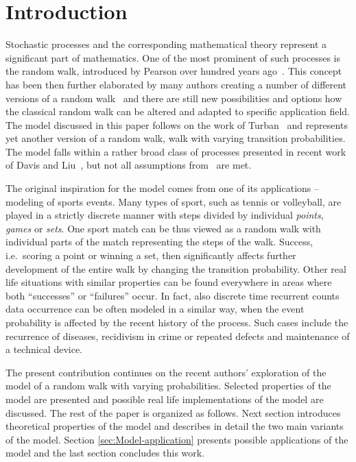 \documentclass[runningheads]{CMSIM}
\begin{document}
    \section{Introduction}\label{sec:introduction}

    Stochastic processes and the corresponding mathematical theory represent
    a significant part of mathematics.
    One of the most prominent of such
    processes is the random walk, introduced by Pearson over hundred
    years ago~\cite{pearson1905problem}.
    This concept has been then further
    elaborated by many authors creating a number of different versions
    of a random walk~\cite{spitzer2013principles} and there are still
    new possibilities and options how the classical random walk can be
    altered and adapted to specific application field.
    The model discussed
    in this paper follows on the work of Turban~\cite{turban2010random}
    and represents yet another version of a random walk, walk with varying
    transition probabilities.
    The model falls within a rather broad class
    of processes presented in recent work of Davis and Liu~\cite{davis2012theory}, but not all assumptions from~\cite{davis2012theory} are met.

    The original inspiration for the model comes from one of its applications -- modeling of sports events.
    Many types of sport, such as tennis
    or volleyball, are played in a strictly discrete manner with steps
    divided by individual \emph{points},\emph{ games }or \emph{sets}.
    One sport match can be thus viewed as a random walk with individual
    parts of the match representing the steps of the walk.
    Success, i.e.\ scoring a point or winning a set, then significantly affects further
    development of the entire walk by changing the transition probability.
    Other real life situations with similar properties can be found everywhere
    in areas where both ``successes'' or ``failures'' occur.
    In fact,
    also discrete time recurrent counts data occurrence can be often modeled
    in a similar way, when the event probability is affected by the recent history of the process.
    Such cases include the recurrence of diseases, recidivism
    in crime or repeated defects and maintenance of a technical
    device.

    The present contribution continues on the recent authors' exploration
    of the model of a random walk with varying probabilities.
    Selected
    properties of the model are presented and possible real life implementations
    of the model are discussed.
    The rest of the paper is organized as
    follows.
    Next section introduces theoretical properties of the model
    and describes in detail the two main variants of the model.
    Section \ref{sec:Model-application}
    presents possible applications of the model and the last section concludes
    this work.
\end{document}
